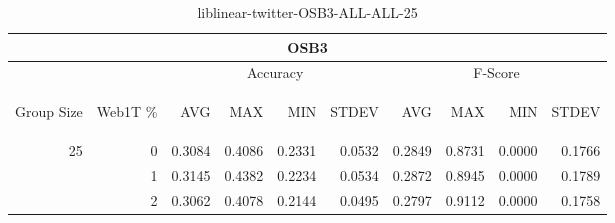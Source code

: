 \begin{center}
\begin{table}[htbp]
\begin{tabular}{ | r | r | r | r | r | r | r | r | r | r |}
\hline
\multicolumn{10}{|c|}{OSB3}\\
\hline
 & & \multicolumn{4}{|c|}{Accuracy} & \multicolumn{4}{|c|}{F-Score}\\ \cline{3-10}
\begin{sideways}Group Size\end{sideways} & \begin{sideways}Web1T \%\end{sideways} & \begin{sideways}AVG\end{sideways} & \begin{sideways}MAX\end{sideways} & \begin{sideways}MIN\end{sideways} & \begin{sideways}STDEV\end{sideways} & \begin{sideways}AVG\end{sideways} & \begin{sideways}MAX\end{sideways} & \begin{sideways}MIN\end{sideways} & \begin{sideways}STDEV\end{sideways}\\
\hline
\multirow{3}{*}{25}
 & 0 & 0.3084 & 0.4086 & 0.2331 & 0.0532 & 0.2849 & 0.8731 & 0.0000 & 0.1766\\ \cline{2-10}
 & 1 & 0.3145 & 0.4382 & 0.2234 & 0.0534 & 0.2872 & 0.8945 & 0.0000 & 0.1789\\ \cline{2-10}
 & 2 & 0.3062 & 0.4078 & 0.2144 & 0.0495 & 0.2797 & 0.9112 & 0.0000 & 0.1758\\ \cline{2-10}
\hline
\end{tabular}
\caption{liblinear-twitter-OSB3-ALL-ALL-25}
\end{table}
\end{center}

